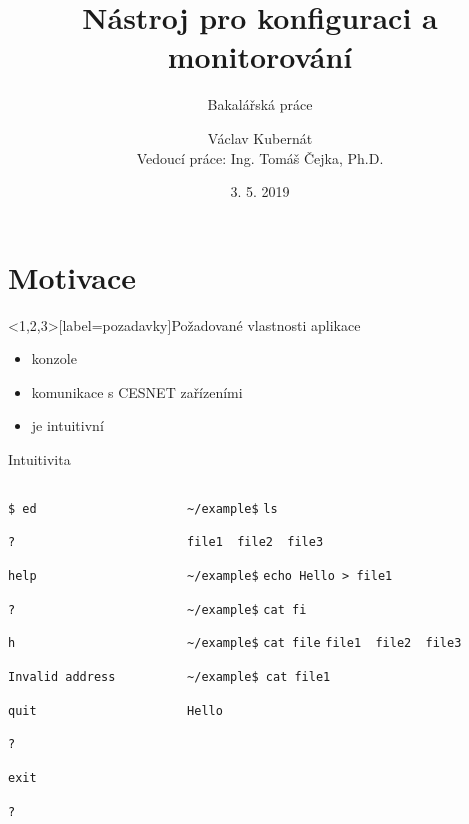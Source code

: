 \documentclass[czech,aspectratio=169]{beamer}
\title[Nástroj pro konfiguraci a monitorování]{Nástroj pro konfiguraci a monitorování}
\subtitle{Bakalářská práce}
\institute[FIT ČVUT v Praze]{Fakulta informačních technologií \\ České vysoké učení technické v Praze}
\author[V. Kubernát]{Václav Kubernát \\ Vedoucí práce: Ing. Tomáš Čejka, Ph.D.}
\date{3. 5. 2019}
\begin{document}
\begin{frame}
    \titlepage{} %
\end{frame}

\section{Motivace}
  \begin{frame}<1,2,3>[label=pozadavky]{Požadované vlastnosti aplikace}
      \begin{itemize}[<+>]
          \item konzole
          \item komunikace s CESNET zařízeními
          \item je intuitivní
      \end{itemize}
  \end{frame}

\begin{frame}[fragile]{Intuitivita}
    \begin{columns}
        \pause{}
        \begin{column}{.47\textwidth}
\verb|$ ed|

\pause{}
\verb||

\verb|?|

\pause{}
\verb|help|

\pause{}
\verb|?|

\pause{}
\verb|h|

\pause{}
\verb|Invalid address|

\pause{}
\verb|quit|

\verb|?|

\pause{}
\verb|exit|

\verb|?|
        \pause{}
        \end{column}
        \begin{column}{.47\textwidth}
\verb|~/example$|\pause{} \verb|ls|

\pause{}
\verb|file1  file2  file3|

\verb|~/example$|\pause{} \verb|echo Hello > file1|

\verb|~/example$|\pause{} \verb|cat fi| \pause{}

\verb|~/example$| \verb|cat file|
\pause{}
\verb|file1  file2  file3|

\verb|~/example$ cat file|\pause{}\verb|1|

\pause{}
\verb|Hello|
        \end{column}
    \end{columns}
\end{frame}
\end{document}
